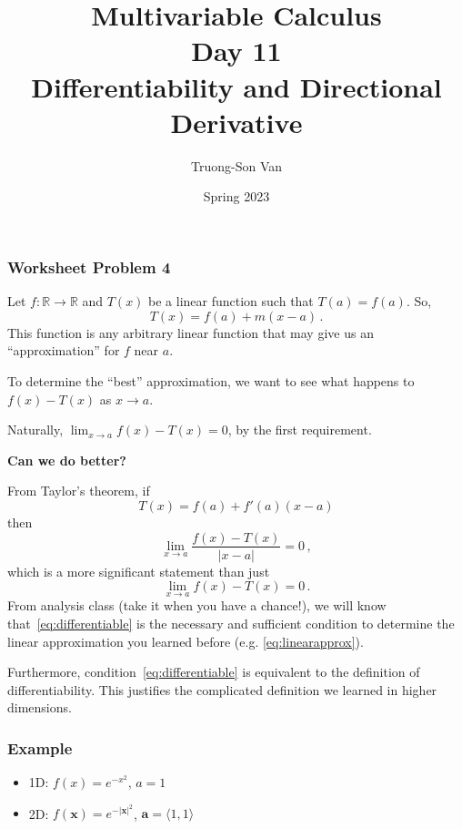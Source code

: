 \documentclass[aspectratio=169,handout]{beamer}
\title{ Multivariable Calculus \\ Day 11\\ Differentiability and  Directional Derivative }
\institute{Fulbright University Vietnam}
\author{Truong-Son Van}
\date{Spring 2023}
\newcommand{\vect}{\mathbf}
\newcommand{\R}{\mathbb{R}}
\begin{document}
\maketitle

\begin{frame}
    \frametitle{ Worksheet Problem 4 }
    Let $f: \R \to \R$
    and $T(x)$ be a linear function such that $T(a) = f(a)$.
    So, 
    \begin{equation*}
        T(x) = f(a) + m(x-a) \,.
    \end{equation*}
    This function is any arbitrary linear function that may give us an ``approximation''
    for $f$ near $a$. \pause

    To determine the ``best'' approximation, we want to see what happens to
    $f(x) - T(x)$ as $x\to a$. \pause

    Naturally, $\lim_{x\to a} f(x) - T(x) = 0$, by the first requirement. \pause

    \textbf{Can we do better?}
\end{frame}

\begin{frame}
    From Taylor's theorem,
    if 
    \begin{equation}
        T(x) = f(a) + f'(a) (x-a) \label{eq:linearapprox}
    \end{equation}
    then \pause
    \begin{equation}
        \lim_{x\to a} \frac{f(x) - T(x)}{|x-a|} = 0 \,, \label{eq:differentiable}
    \end{equation}
    which is a more significant statement than just
    \begin{equation*}
        \lim_{x\to a} f(x) - T(x) = 0 \,.
    \end{equation*}
    \pause
    From analysis class (take it when you have a chance!), 
   we will know that~\eqref{eq:differentiable} is the
    necessary and sufficient condition to 
    determine the linear approximation you learned before (e.g. \eqref{eq:linearapprox}).

    \pause
    Furthermore, condition~\eqref{eq:differentiable} is equivalent to the definition
    of differentiability.
    This justifies the complicated definition we learned in higher dimensions.
\end{frame}

\begin{frame}
    \frametitle{Example}
    \begin{itemize}
        \item 1D: $f(x) = e^{-x^2}$, $a =1$
        \item 2D: $f(\vect{x}) = e^{-|\vect{x}|^2}$, $\vect{a} = \langle 1,1 \rangle$
    \end{itemize}
\end{frame}
\end{document}
